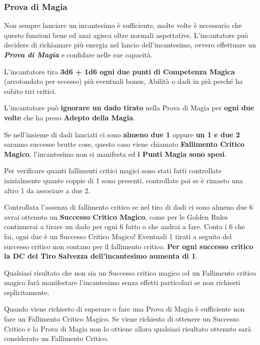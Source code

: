 \begin{multicols}{2}
\subsubsection{Prova di Magia}\label{magieprovadimagia}

Non sempre lanciare un incantesimo è sufficiente, molte volte è necessario che questo funzioni bene ed anzi agisca oltre normali aspettative. L'incantatore può decidere di richiamare più energia nel lancio dell'incantesimo, ovvero effettuare un \emph{\textbf{Prova di Magia}} e confidare nelle sue capacità.

L'incantatore tira \textbf{3d6 + 1d6 ogni due punti di Competenza Magica} (arrotondato per eccesso) più eventuali bonus, Abilità o dadi in più perché ha subito tiri critici.

L'incantatore può \textbf{ignorare un dado tirato} nella Prova di Magia per \textbf{ogni due volte} che ha preso \textbf{Adepto della Magia}.

Se nell'insieme di dadi lanciati ci sono \textbf{almeno due 1} oppure \textbf{un 1 e due 2} saranno successe brutte cose, questo caso viene chiamato \textbf{Fallimento Critico Magico}, l'incantesimo non si manifesta ed \textbf{i Punti Magia sono spesi}.

Per verificare quanti fallimenti critici magici sono stati fatti controllate inizialmente quante coppie di 1 sono presenti, controllate poi se è rimasto una altro 1 da associare a due 2.

Controllata l'assenza di fallimento critico se nel tiro di dadi ci sono almeno due 6 avrai ottenuto un \textbf{Successo Critico Magico}, come per le Golden Rules continuerai a tirare un dado per ogni 6 fatto o che andrai a fare. Conta i 6 che fai, ogni due è un Successo Critico Magico! Eventuali 1 tirati a seguito del successo critico non contano per il fallimento critico. \textbf{Per ogni successo critico la DC del Tiro Salvezza dell'incantesimo aumenta di 1}.

Qualsiasi risultato che non sia un Successo critico magico od un Fallimento critico magico farà manifestare l'incantesimo senza effetti particolari se non richiesti esplicitamente.

Quando viene richiesto di superare o fare una Prova di Magia è sufficiente non fare un Fallimento Critico Magico. Se viene richiesto di ottenere un Successo Critico e la Prova di Magia non lo ottiene allora qualsiasi risultato ottenuto sarà considerato un Fallimento Critico.


\end{multicols}
